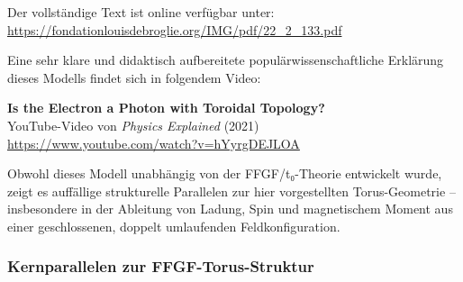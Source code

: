 	Der vollständige Text ist online verfügbar unter: \\
	\url{https://fondationlouisdebroglie.org/IMG/pdf/22_2_133.pdf}
	
	Eine sehr klare und didaktisch aufbereitete populärwissenschaftliche Erklärung dieses Modells findet sich in folgendem Video:
	
	\begin{center}
		\textbf{Is the Electron a Photon with Toroidal Topology?} \\
		YouTube-Video von \emph{Physics Explained} (2021) \\
		\url{https://www.youtube.com/watch?v=hYyrgDEJLOA}
	\end{center}
	
	Obwohl dieses Modell unabhängig von der FFGF/t₀-Theorie entwickelt wurde, zeigt es auffällige strukturelle Parallelen zur hier vorgestellten Torus-Geometrie – insbesondere in der Ableitung von Ladung, Spin und magnetischem Moment aus einer geschlossenen, doppelt umlaufenden Feldkonfiguration.
	
	\subsubsection{Kernparallelen zur FFGF-Torus-Struktur}
	
